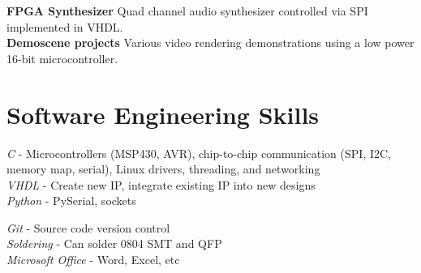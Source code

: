 \documentclass[10pt]{article} %
\begin{document}
\textbf{FPGA Synthesizer} Quad channel audio synthesizer controlled via SPI implemented in VHDL.\\
\smallskip
\textbf{Demoscene projects} Various video rendering demonstrations using a low power 16-bit microcontroller.




\section{Software Engineering Skills}

{
  \textit{C} - Microcontrollers (MSP430, AVR), chip-to-chip communication (SPI, I2C, memory map, serial), Linux drivers, threading, and networking\\
\textit{VHDL} - Create new IP, integrate existing IP into new designs\\
\textit{Python} - PySerial, sockets
}


{
\textit{Git} - Source code version control\\
\textit{Soldering} - Can solder 0804 SMT and QFP\\
\textit{Microsoft Office} - Word, Excel, etc
}
\end{document}
